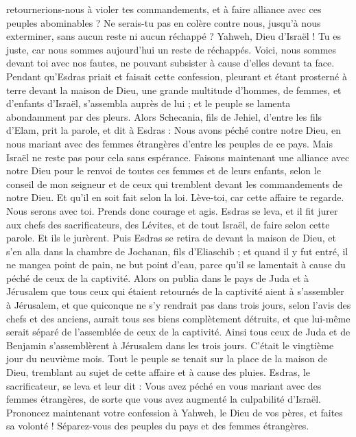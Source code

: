 \begin{multicols}{2}
retournerions-nous à violer tes commandements, et à faire alliance avec ces peuples abominables ? Ne serais-tu pas en colère contre nous, jusqu'à nous exterminer, sans aucun reste ni aucun réchappé ?
Yahweh, Dieu d'Israël ! Tu es juste, car nous sommes aujourd'hui un reste de réchappés. Voici, nous sommes devant toi avec nos fautes, ne pouvant subsister à cause d’elles devant ta face.
\VerseOne{}Pendant qu’Esdras priait et faisait cette confession, pleurant et étant prosterné à terre devant la maison de Dieu, une grande multitude d'hommes, de femmes, et d’enfants d'Israël, s'assembla auprès de lui ; et le peuple se lamenta abondamment par des pleurs.
Alors Schecania, fils de Jehiel, d'entre les fils d’Elam, prit la parole, et dit à Esdras : Nous avons péché contre notre Dieu, en nous mariant avec des femmes étrangères d'entre les peuples de ce pays. Mais Israël ne reste pas pour cela sans espérance.
Faisons maintenant une alliance avec notre Dieu pour le renvoi de toutes ces femmes et de leurs enfants, selon le conseil de mon seigneur et de ceux qui tremblent devant les commandements de notre Dieu. Et qu'il en soit fait selon la loi.
Lève-toi, car cette affaire te regarde. Nous serons avec toi. Prends donc courage et agis.
Esdras se leva, et il fit jurer aux chefs des sacrificateurs, des Lévites, et de tout Israël, de faire selon cette parole. Et ils le jurèrent.
Puis Esdras se retira de devant la maison de Dieu, et s'en alla dans la chambre de Jochanan, fils d'Eliaschib ; et quand il y fut entré, il ne mangea point de pain, ne but point d'eau, parce qu'il se lamentait à cause du péché de ceux de la captivité.
Alors on publia dans le pays de Juda et à Jérusalem que tous ceux qui étaient retournés de la captivité aient à s'assembler à Jérusalem,
et que quiconque ne s'y rendrait pas dans trois jours, selon l'avis des chefs et des anciens, aurait tous ses biens complètement détruits, et que lui-même serait séparé de l'assemblée de ceux de la captivité.
Ainsi tous ceux de Juda et de Benjamin s'assemblèrent à Jérusalem dans les trois jours. C’était le vingtième jour du neuvième mois. Tout le peuple se tenait sur la place de la maison de Dieu, tremblant au sujet de cette affaire et à cause des pluies.
Esdras, le sacrificateur, se leva et leur dit : Vous avez péché en vous mariant avec des femmes étrangères, de sorte que vous avez augmenté la culpabilité d'Israël.
Prononcez maintenant votre confession à Yahweh, le Dieu de vos pères, et faites sa volonté ! Séparez-vous des peuples du pays et des femmes étrangères.

\end{multicols}
